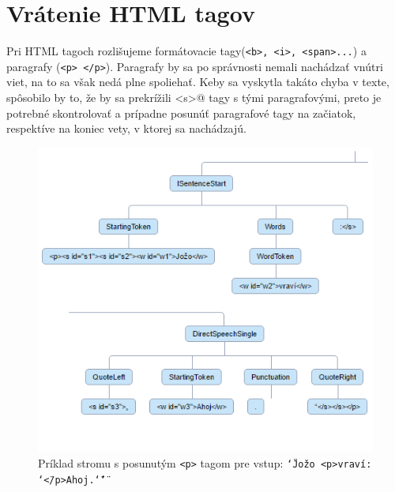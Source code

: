 \documentclass[12pt,a4paper]{report}
\theoremstyle{definition}
\theoremstyle{remark}
\begin{document}
\section{Vrátenie HTML tagov}
Pri HTML tagoch rozlišujeme formátovacie tagy(\verb!<b>, <i>, <span>...!) a paragrafy (\verb!<p> </p>!). Paragrafy by sa po správnosti nemali nachádzať vnútri viet, na to sa však nedá plne spoliehať. Keby sa vyskytla takáto chyba v texte, spôsobilo by to, že by sa prekrížili \verb@<s>@ tagy s tými paragrafovými, preto je potrebné skontrolovať a prípadne posunúť paragrafové tagy na začiatok, respektíve na koniec vety, v ktorej sa nachádzajú.
\begin{figure}[H]
\centering
\includegraphics[scale=2.6]{adjustedPTags}
\captionsetup{width=.7\linewidth}
\caption{Príklad stromu s posunutým \texttt{<p>} tagom pre vstup: \texttt{\char`\"Jožo <p>vraví: \char`\"</p>Ahoj.\char`\"\char`\"}}
\end{figure}
\end{document}
